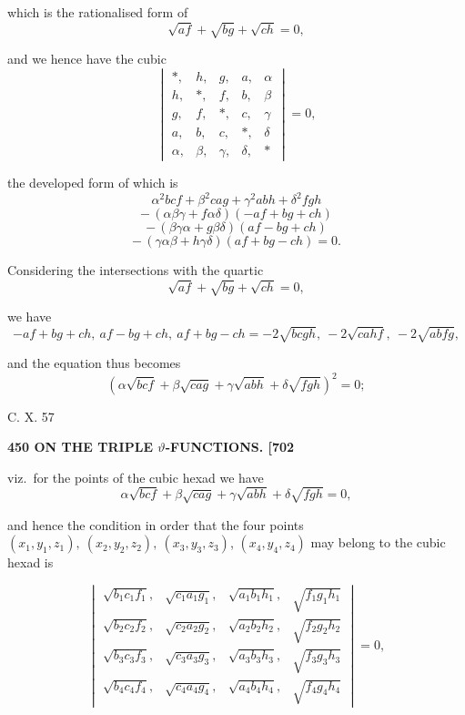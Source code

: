 \documentclass[11pt]{article}
\begin{document}
which is the rationalised form of
\[
\sqrt{af} + \sqrt{bg} + \sqrt{ch} = 0,
\]

and we hence have the cubic
\[
\begin{vmatrix}
\ast, & h, & g, & a, & \alpha \\
h, & \ast, & f, & b, & \beta \\
g, & f, & \ast, & c, & \gamma \\
a, & b, & c, & \ast, & \delta \\
\alpha, & \beta, & \gamma, & \delta, & \ast
\end{vmatrix} = 0,
\]

the developed form of which is
\[
\alpha^2 bcf + \beta^2 cag + \gamma^2 abh + \delta^2 fgh
\]
\[
-\,(\alpha\beta\gamma + f\alpha\delta)(-af + bg + ch)
\]
\[
-\,(\beta\gamma\alpha + g\beta\delta)(af - bg + ch)
\]
\[
-\,(\gamma\alpha\beta + h\gamma\delta)(af + bg - ch) = 0.
\]

Considering the intersections with the quartic
\[
\sqrt{af} + \sqrt{bg} + \sqrt{ch} = 0,
\]

we have
\[
-af + bg + ch,\ af - bg + ch,\ af + bg - ch = -2\sqrt{bcgh},\ -2\sqrt{cahf},\ -2\sqrt{abfg},
\]

and the equation thus becomes
\[
(\alpha\sqrt{bcf} + \beta\sqrt{cag} + \gamma\sqrt{abh} + \delta\sqrt{fgh})^2 = 0;
\]

\hfill C. X. \hfill 57

\bigskip
\noindent\textbf{450 \hfill ON THE TRIPLE $\vartheta$-FUNCTIONS. \hfill [702}

\medskip

viz.\ for the points of the cubic hexad we have
\[
\alpha\sqrt{bcf} + \beta\sqrt{cag} + \gamma\sqrt{abh} + \delta\sqrt{fgh} = 0,
\]

and hence the condition in order that the four points $(x_1, y_1, z_1),\ (x_2, y_2, z_2),\ (x_3, y_3, z_3)$, $(x_4, y_4, z_4)$ may belong to the cubic hexad is

\[
\begin{vmatrix}
\sqrt{b_1 c_1 f_1}, & \sqrt{c_1 a_1 g_1}, & \sqrt{a_1 b_1 h_1}, & \sqrt{f_1 g_1 h_1} \\
\sqrt{b_2 c_2 f_2}, & \sqrt{c_2 a_2 g_2}, & \sqrt{a_2 b_2 h_2}, & \sqrt{f_2 g_2 h_2} \\
\sqrt{b_3 c_3 f_3}, & \sqrt{c_3 a_3 g_3}, & \sqrt{a_3 b_3 h_3}, & \sqrt{f_3 g_3 h_3} \\
\sqrt{b_4 c_4 f_4}, & \sqrt{c_4 a_4 g_4}, & \sqrt{a_4 b_4 h_4}, & \sqrt{f_4 g_4 h_4}
\end{vmatrix} = 0,
\]
\end{document}
